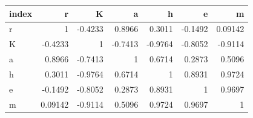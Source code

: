 \begin{tabular}{lrrrrrr}
\toprule
index & r & K & a & h & e & m \\
\midrule
r & 1 & -0.4233 & 0.8966 & 0.3011 & -0.1492 & 0.09142 \\
K & -0.4233 & 1 & -0.7413 & -0.9764 & -0.8052 & -0.9114 \\
a & 0.8966 & -0.7413 & 1 & 0.6714 & 0.2873 & 0.5096 \\
h & 0.3011 & -0.9764 & 0.6714 & 1 & 0.8931 & 0.9724 \\
e & -0.1492 & -0.8052 & 0.2873 & 0.8931 & 1 & 0.9697 \\
m & 0.09142 & -0.9114 & 0.5096 & 0.9724 & 0.9697 & 1 \\
\bottomrule
\end{tabular}
